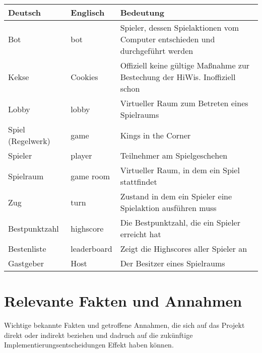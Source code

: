 \begin{center}
		\begin{longtable}{p{} p{} p{}}
			\textbf{Deutsch} & \textbf{Englisch} & \textbf{Bedeutung} \\
			\hline \hline \endhead
                     
			Bot & bot & Spieler, dessen Spielaktionen vom Computer entschieden und durchgeführt werden\\
			Kekse & Cookies & Offiziell keine gültige Maßnahme zur Bestechung der HiWis. Inoffiziell schon\\          
 			Lobby & lobby & Virtueller Raum zum Betreten eines Spielraums\\	
			Spiel (Regelwerk) & game & Kings in the Corner \\
			Spieler & player & Teilnehmer am Spielgeschehen\\
			Spielraum & game room & Virtueller Raum, in dem ein Spiel stattfindet\\
			Zug & turn & Zustand in dem ein Spieler eine Spielaktion ausführen muss\\
			Bestpunktzahl & highscore & Die Bestpunktzahl, die ein Spieler erreicht hat\\
			Bestenliste & leaderboard & Zeigt die Highscores aller Spieler an\\
			Gastgeber & Host & Der Besitzer eines Spielraums\\
		\end{longtable}
\end{center}

\section{Relevante Fakten und Annahmen}

Wichtige bekannte Fakten und getroffene Annahmen, die sich auf das Projekt direkt oder indirekt beziehen und dadruch auf die zukünftige Implementierungsentscheidungen Effekt haben können.


\setcounter{fa}{10}

